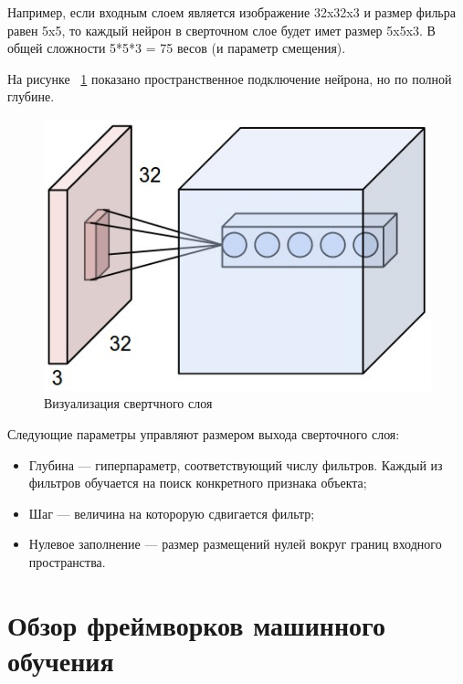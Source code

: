 \documentclass[a4paper,english,russian]{G2-105}
\begin{document}
\par Например, если входным слоем является изображение 32x32x3 и размер фильра равен 5x5, то каждый нейрон в сверточном слое будет имет размер 5x5x3. В общей сложности 5*5*3 = 75 весов (и параметр смещения). 
\par На рисунке ~\ref{depthcol} показано пространственное подключение нейрона, но по полной глубине. 
\begin{figure}
    \includegraphics[width=0.5\linewidth]{depthcol.png}
    \caption{Визуализация свертчного слоя}
	\label{depthcol}
\end{figure}
\par Следующие параметры управляют размером выхода сверточного слоя:
\begin{itemize}
\item Глубина --- гиперпараметр, соответствующий числу фильтров. Каждый из фильтров обучается на поиск конкретного признака объекта;
\item Шаг --- величина на которорую сдвигается фильтр;
\item Нулевое заполнение --- размер размещений нулей вокруг границ входного пространства.
\end{itemize}
\ttl


\section{Обзор фреймворков машинного обучения}
\end{document}
